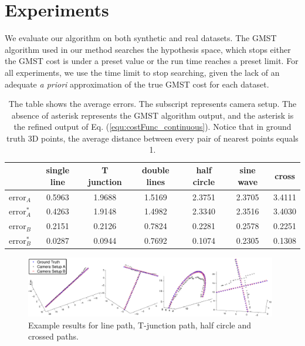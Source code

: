
\section{Experiments}
We evaluate our algorithm on both synthetic and real datasets.
The GMST algorithm used in our method \cite{Ferreira_ESWA2012} searches the hypothesis space, which stops either the GMST cost is under a preset value or the run time reaches a preset limit. For all experiments, we use the time limit to stop searching, given the lack of an adequate {\em a priori} approximation of the true  GMST cost for each dataset.
\begin{table} [b]
\centering
\begin{tabular}{|c|c|c|c|c|c|c|}  \hline
               & single line & T junction & double lines & half circle & sine wave & cross \\
  \hline
  $\text{error}_A$ & 0.5963 & 1.9688 & 1.5169 & 2.3751  & 2.3705 & 3.4111\\
  \hline
  $\text{error}^*_A$ & 0.4263 & 1.9148 & 1.4982 & 2.3340  & 2.3516 & 3.4030 \\
  \hline
  $\text{error}_B$ & 0.2151 & 0.2126 & 0.7824 & 0.2281& 0.2578 &0.2251 \\
  \hline
  $\text{error}^*_B$ & 0.0287 & 0.0944 & 0.7692 & 0.1074 & 0.2305 & 0.1308\\
  \hline
\end{tabular}
\caption{ The table shows the average errors. The subscript represents camera setup. The absence of asterisk represents the GMST algorithm output, and the asterisk is the refined output of Eq. (\ref{equ:costFunc_continuous}). Notice that in ground truth 3D points, the average distance between every pair of nearest points  equals 1. }
\label{fig:syntheticDataResult}
\end{table}


\begin{figure}[t]
\centering
    \includegraphics[width=0.98\textwidth]{chapter4/resource/allfig.pdf}
\caption{Example results for line path, T-junction path, half circle and crossed paths.}
\label{fig:synthetic}
\end{figure}


